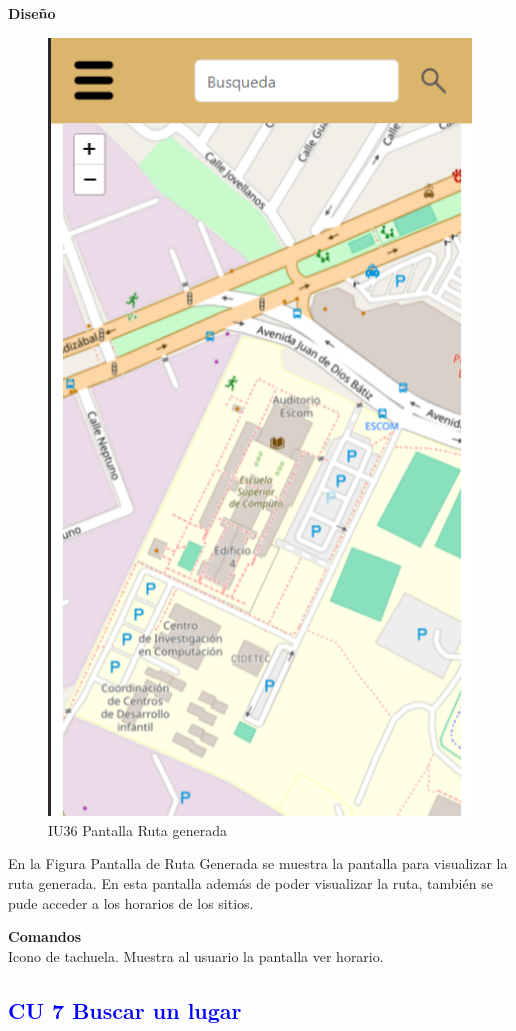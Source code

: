 \textbf{Diseño}
    \begin{figure}[h]
        
            \centering
            \includegraphics[width=.4\linewidth]{entregable final/pantallasSistema/IU09 Pantalla Mapa principal.png}
    \caption{IU36 Pantalla Ruta generada}
    
    \end{figure}

En la Figura Pantalla de Ruta Generada se muestra la pantalla para visualizar la ruta generada. En esta pantalla además
de poder visualizar la ruta, también se pude acceder a los horarios de los sitios.

\textbf{Comandos} \\
Icono de tachuela. Muestra al usuario la pantalla ver horario.





\newpage
\subsection{\textcolor{blue}{CU 7 Buscar un lugar}}

